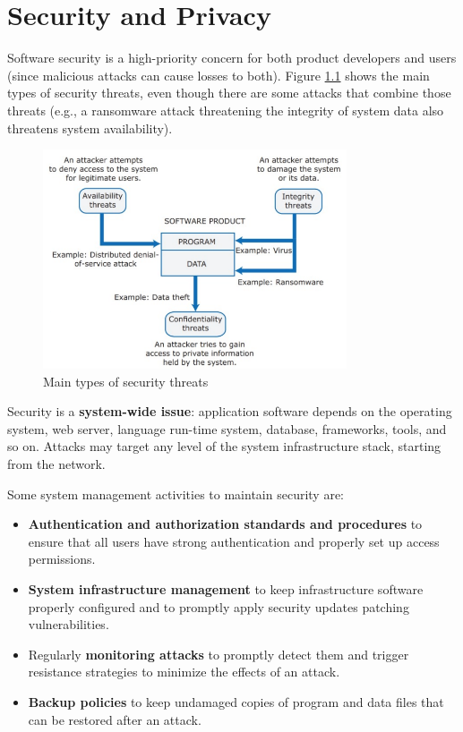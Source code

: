 \chapter{Security and Privacy}

Software security is a high-priority concern for both product developers and users (since malicious attacks can cause losses to both). Figure \ref{fig:threats-security} shows the main types of security threats, even though there are some attacks that combine those threats (e.g., a ransomware attack threatening the integrity of system data also threatens system availability).

\begin{figure} [H]
    \centering
    \includegraphics[width=0.8\textwidth]{images/Security/threats-security.png}
    \caption{Main types of security threats}
    \label{fig:threats-security}
\end{figure} 

Security is a \textbf{system-wide issue}: application software depends on the operating system, web server, language run-time system, database, frameworks, tools, and so on. Attacks may target any level of the system infrastructure stack, starting from the network.

\newpage
\noindent Some system management activities to maintain security are:
\begin{itemize}
    \item \textbf{Authentication and authorization standards and procedures} to ensure that all users have strong authentication and properly set up access permissions.
    \item \textbf{System infrastructure management} to keep infrastructure software properly configured and to promptly apply security updates patching vulnerabilities.
    \item Regularly \textbf{monitoring attacks} to promptly detect them and trigger resistance strategies to minimize the effects of an attack.
    \item \textbf{Backup policies} to keep undamaged copies of program and data files that can be restored after an attack.
\end{itemize}

